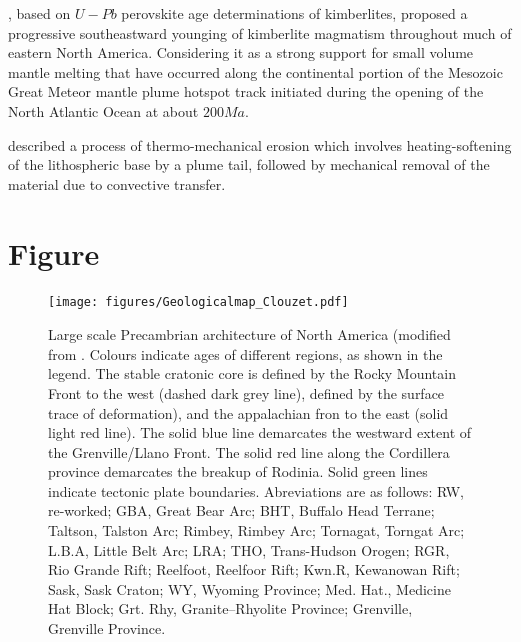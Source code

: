 \documentclass[12pt]{article}
\begin{document}
	\cite{heaman2000timing}, based on $U-Pb$ perovskite age determinations of kimberlites, proposed a progressive southeastward younging of kimberlite magmatism throughout much of eastern North America. Considering it as a strong support for small volume mantle melting that have occurred along the continental portion of the Mesozoic Great Meteor mantle plume hotspot track initiated during the opening of the North Atlantic Ocean at about $200Ma$. \citep[See figure 4. in][]{heaman2000timing}

	\cite{davies1994thermomechanical} described a process of thermo-mechanical erosion which involves heating-softening of the lithospheric base by a plume tail, followed by mechanical removal of the material due to convective transfer. \citep{rondenay2000lithospheric}



\section{Figure}

	\begin{figure}

		\centering
		\centerline{\texttt{[image: figures/Geologicalmap\_Clouzet.pdf]}}

		\caption{\baselineskip 18pt
		Large scale Precambrian architecture of North America (modified from \cite{whitmeyer2007tectonic}. Colours indicate ages of different regions, as shown in the legend. The stable cratonic core is defined by the Rocky Mountain Front to the west (dashed dark grey line), defined by the surface trace of deformation), and the appalachian fron to the east (solid light red line). The solid blue line demarcates the westward extent of the Grenville/Llano Front. The solid red line along the Cordillera province demarcates the breakup of Rodinia. Solid green lines indicate tectonic plate boundaries. Abreviations are as follows: RW, re-worked; GBA, Great Bear Arc; BHT, Buffalo Head Terrane; Taltson, Talston Arc; Rimbey, Rimbey Arc; Tornagat, Torngat Arc; L.B.A, Little Belt Arc; LRA; THO, Trans-Hudson Orogen; RGR, Rio Grande Rift; Reelfoot, Reelfoor Rift; Kwn.R, Kewanowan Rift; Sask, Sask Craton; WY, Wyoming Province; Med. Hat., Medicine Hat Block; Grt. Rhy, Granite–Rhyolite Province; Grenville, Grenville Province.
		}

		\label{mapgeol}

	\end{figure}
\end{document}

